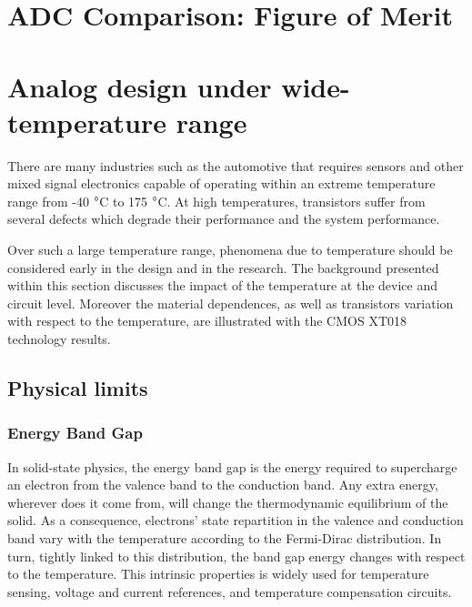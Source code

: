 \section{ADC Comparison: Figure of Merit}
\label{sec:fom}


\section{Analog design under wide-temperature range}
\label{sec:temperature-analogue}

There are many industries such as the automotive that requires sensors and other mixed signal electronics capable of operating within an extreme temperature range from -40 \(\degree \)C to 175 \(\degree \)C. At high temperatures, transistors suffer from several defects which degrade their performance and the system performance.

Over such a large temperature range, phenomena due to temperature should be considered early in the design and in the research. The background presented within this section discusses the impact of the temperature at the device and circuit level. Moreover the material dependences, as well as transistors variation with respect to the temperature, are illustrated with the CMOS XT018 technology results. %
\subsection{Physical limits}


\subsubsection{Energy Band Gap}        %
\label{sec:bandgap}
In solid-state physics, the energy band gap is the energy required to supercharge an electron from the valence band to the conduction band. Any extra energy, wherever does it come from, will change the thermodynamic equilibrium of the solid. As a consequence, electrons' state repartition in the valence and conduction band vary with the temperature according to the Fermi-Dirac distribution. In turn, tightly linked to this distribution, the band gap energy changes with respect to the temperature. This intrinsic properties is widely used for temperature sensing, voltage and current references, and temperature compensation circuits.


